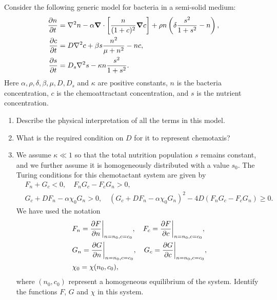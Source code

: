 \documentclass[a4paper, 12pt]{article}
\begin{document}
\begin{enumerate}[label={\bf \arabic{*}.\;}, ref={\arabic{*}},itemsep=3ex, left=0ex]

    {
      Consider the following generic model for bacteria in a semi-solid medium:
      \begin{subequations}
        \begin{align}
          \pd{n}{t} &=\nabla^2 n - \alpha\vnabla\cdot\left[\frac{n}{(1+c)^2}\vnabla c\right] + \rho n \left(\delta\frac{s^2}{1+s^2} - n\right),\\
          \pd{c}{t}  &= D\nabla^2 c + \beta s\frac{n^2}{\mu + n^2} - n c,\\
          \pd{s}{t} &= D_s\nabla^2s - \kappa n \frac{s^2}{1+s^2}.
        \end{align}
      \end{subequations}
      Here $\alpha,\rho,\delta,\beta,\mu,D,D_s$ and $\kappa$ are positive constants, $n$ is the bacteria concentration, $c$ is the chemoattractant concentration, and $s$ is the nutrient concentration.
      \begin{enumerate}[label=(\alph*)]
        \item Describe the physical interpretation of all the terms in this model.
        \item What is the required condition on $D$ for it to represent chemotaxis?
        \item We assume $\kappa \ll 1$ so that the total nutrition population $s$ remains constant, and we further assume it is homogeneously distributed with a value $s_0$. The Turing conditions for this chemotactant system are given by
          \begin{align*}
            &F_n + G_c <0, \quad F_n G_c - F_cG_n >0,\\
            &G_c + D F_n -\alpha\chi_0 G_n >0, \quad \left(G_c + D F_n -\alpha\chi_0 G_n\right)^2 - 4 D(F_n G_c - F_cG_n) \geq 0.
          \end{align*}
          We have used the notation
          \begin{align*}
            &F_{n} = \pd{F}{n}\bigg\vert_{n=n_0,c=c_0},\quad F_{c} = \pd{F}{c}\bigg\vert_{n=n_0,c=c_0},\\
            &G_{n} = \pd{G}{n}\bigg\vert_{n=n_0,c=c_0},\quad G_{c} = \pd{G}{c}\bigg\vert_{n=n_0,c=c_0},\\
            &\chi_ 0 = \chi(n_0,c_0),
          \end{align*}
          where $(n_0,c_0)$ represent a homogeneous equilibrium of the system.
          Identify the functions $F$, $G$ and $\chi$ in this system.


\end{enumerate}}
\end{enumerate}
\end{document}
